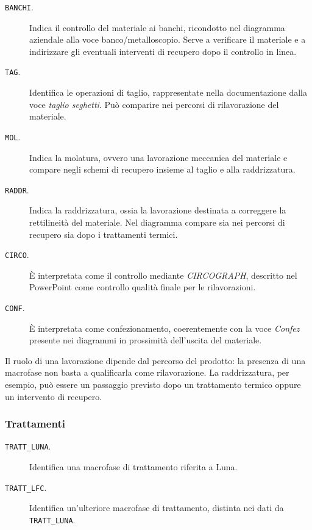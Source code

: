 \begin{description}
\item[\texttt{BANCHI}.] Indica il controllo del materiale ai banchi, ricondotto nel diagramma aziendale alla voce banco/metalloscopio. Serve a verificare il materiale e a indirizzare gli eventuali interventi di recupero dopo il controllo in linea.

\item[\texttt{TAG}.] Identifica le operazioni di taglio, rappresentate nella documentazione dalla voce \emph{taglio seghetti}. Può comparire nei percorsi di rilavorazione del materiale.

\item[\texttt{MOL}.] Indica la molatura, ovvero una lavorazione meccanica del materiale e compare negli schemi di recupero insieme al taglio e alla raddrizzatura.

\item[\texttt{RADDR}.] Indica la raddrizzatura, ossia la lavorazione destinata a correggere la rettilineità del materiale. Nel diagramma compare sia nei percorsi di recupero sia dopo i trattamenti termici.

\item[\texttt{CIRCO}.] È interpretata come il controllo mediante \emph{CIRCOGRAPH}, descritto nel PowerPoint come controllo qualità finale per le rilavorazioni.

\item[\texttt{CONF}.] È interpretata come confezionamento, coerentemente con la voce \emph{Confez} presente nei diagrammi in prossimità dell'uscita del materiale.
\end{description}

Il ruolo di una lavorazione dipende dal percorso del prodotto: la presenza di una macrofase non basta a qualificarla come rilavorazione. La raddrizzatura, per esempio, può essere un passaggio previsto dopo un trattamento termico oppure un intervento di recupero.

\subsubsection{Trattamenti}

\begin{description}
\item[\texttt{TRATT\_LUNA}.] Identifica una macrofase di trattamento riferita a Luna.

\item[\texttt{TRATT\_LFC}.] Identifica un'ulteriore macrofase di trattamento, distinta nei dati da \texttt{TRATT\_LUNA}.
\end{description}


